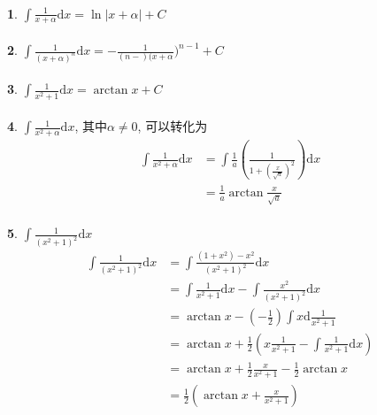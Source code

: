 \paragraph{}
\textbf{1}. $\int \frac{1}{x + \alpha} \mathrm{d} x= \ln{|x + \alpha|} + C$

\paragraph{}
\textbf{2}. $\int \frac{1}{(x + \alpha)^n} \mathrm{d} x = - \frac{1}{(n -) (x + \alpha})^{n-1} + C$

\paragraph{}
\textbf{3}. $\int \frac{1}{x^2 + 1} \mathrm{d} x = \arctan{x} + C$

\paragraph{}
\textbf{4}. $\int \frac{1}{x^2 + \alpha} \mathrm{d} x$, 其中$\alpha \neq 0$, 可以转化为
\begin{align*}
\int \frac{1}{x^2 + \alpha} \mathrm{d} x & = \int \frac{1}{a} (\frac{1}{1 + (\frac{x}{\sqrt{a}})^2}) \mathrm{d} x  \\
& = \frac{1}{a} \arctan{\frac{x}{\sqrt{a}}}
\end{align*}


\paragraph{}
\textbf{5}. $\int \frac{1}{(x^2 + 1)^2} \mathrm{d} x $
\begin{align*}
\int \frac{1}{(x^2 + 1)^2} \mathrm{d} x & = \int \frac{(1 + x^2) - x^2}{(x^2 + 1)^2} \mathrm{d} x \\
& =  \int  \frac{1}{x^2 + 1} \mathrm{d} x  - \int \frac{x^2}{(x^2 + 1)^2} \mathrm{d} x \\
& = \arctan{x} - (-\frac{1}{2}) \int x \mathrm{d} \frac{1}{x^2 + 1} \\
& = \arctan{x} + \frac{1}{2} (x \frac{1}{x^2 + 1} - \int \frac{1}{x^2 + 1} \mathrm{d} x ) \\
& = \arctan{x} + \frac{1}{2} \frac{x}{x^2 + 1} - \frac{1}{2} \arctan{x} \\
& = \frac{1}{2} (\arctan{x} + \frac{x}{x^2 + 1})
\end{align*}


